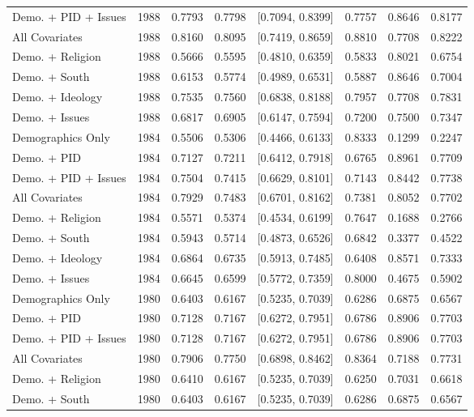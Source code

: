 \begin{longtable}{lrrrlrrr}
  Demo. + PID + Issues & 1988 & 0.7793 & 0.7798 & [0.7094, 0.8399] & 0.7757 & 0.8646 & 0.8177 \\ 
  All Covariates & 1988 & 0.8160 & 0.8095 & [0.7419, 0.8659] & 0.8810 & 0.7708 & 0.8222 \\ 
  Demo. + Religion & 1988 & 0.5666 & 0.5595 & [0.4810, 0.6359] & 0.5833 & 0.8021 & 0.6754 \\ 
  Demo. + South & 1988 & 0.6153 & 0.5774 & [0.4989, 0.6531] & 0.5887 & 0.8646 & 0.7004 \\ 
  Demo. + Ideology & 1988 & 0.7535 & 0.7560 & [0.6838, 0.8188] & 0.7957 & 0.7708 & 0.7831 \\ 
  Demo. + Issues & 1988 & 0.6817 & 0.6905 & [0.6147, 0.7594] & 0.7200 & 0.7500 & 0.7347 \\ 
  Demographics Only & 1984 & 0.5506 & 0.5306 & [0.4466, 0.6133] & 0.8333 & 0.1299 & 0.2247 \\ 
  Demo. + PID & 1984 & 0.7127 & 0.7211 & [0.6412, 0.7918] & 0.6765 & 0.8961 & 0.7709 \\ 
  Demo. + PID + Issues & 1984 & 0.7504 & 0.7415 & [0.6629, 0.8101] & 0.7143 & 0.8442 & 0.7738 \\ 
  All Covariates & 1984 & 0.7929 & 0.7483 & [0.6701, 0.8162] & 0.7381 & 0.8052 & 0.7702 \\ 
  Demo. + Religion & 1984 & 0.5571 & 0.5374 & [0.4534, 0.6199] & 0.7647 & 0.1688 & 0.2766 \\ 
  Demo. + South & 1984 & 0.5943 & 0.5714 & [0.4873, 0.6526] & 0.6842 & 0.3377 & 0.4522 \\ 
  Demo. + Ideology & 1984 & 0.6864 & 0.6735 & [0.5913, 0.7485] & 0.6408 & 0.8571 & 0.7333 \\ 
  Demo. + Issues & 1984 & 0.6645 & 0.6599 & [0.5772, 0.7359] & 0.8000 & 0.4675 & 0.5902 \\ 
  Demographics Only & 1980 & 0.6403 & 0.6167 & [0.5235, 0.7039] & 0.6286 & 0.6875 & 0.6567 \\ 
  Demo. + PID & 1980 & 0.7128 & 0.7167 & [0.6272, 0.7951] & 0.6786 & 0.8906 & 0.7703 \\ 
  Demo. + PID + Issues & 1980 & 0.7128 & 0.7167 & [0.6272, 0.7951] & 0.6786 & 0.8906 & 0.7703 \\ 
  All Covariates & 1980 & 0.7906 & 0.7750 & [0.6898, 0.8462] & 0.8364 & 0.7188 & 0.7731 \\ 
  Demo. + Religion & 1980 & 0.6410 & 0.6167 & [0.5235, 0.7039] & 0.6250 & 0.7031 & 0.6618 \\ 
  Demo. + South & 1980 & 0.6403 & 0.6167 & [0.5235, 0.7039] & 0.6286 & 0.6875 & 0.6567 \\ 

\end{longtable}
